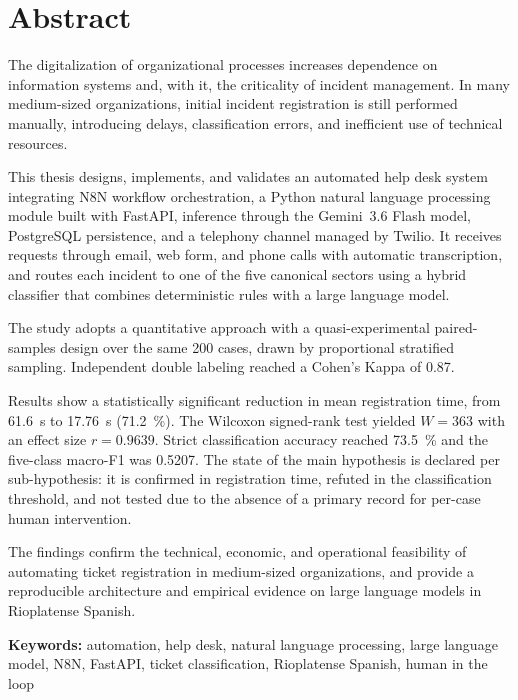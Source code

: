 \newpage
\section*{Abstract}

The digitalization of organizational processes increases dependence on information systems and, with it, the criticality of incident management. In many medium-sized organizations, initial incident registration is still performed manually, introducing delays, classification errors, and inefficient use of technical resources.

This thesis designs, implements, and validates an automated help desk system integrating N8N workflow orchestration, a Python natural language processing module built with FastAPI, inference through the Gemini~3.6 Flash model, PostgreSQL persistence, and a telephony channel managed by Twilio. It receives requests through email, web form, and phone calls with automatic transcription, and routes each incident to one of the five canonical sectors using a hybrid classifier that combines deterministic rules with a large language model.

The study adopts a quantitative approach with a quasi-experimental paired-samples design over the same 200 cases, drawn by proportional stratified sampling. Independent double labeling reached a Cohen's Kappa of 0.87.

Results show a statistically significant reduction in mean registration time, from 61.6~s to 17.76~s (71.2~\%). The Wilcoxon signed-rank test yielded \(W = 363\) with an effect size \(r = 0.9639\). Strict classification accuracy reached 73.5~\% and the five-class macro-F1 was 0.5207. The state of the main hypothesis is declared per sub-hypothesis: it is confirmed in registration time, refuted in the classification threshold, and not tested due to the absence of a primary record for per-case human intervention.

The findings confirm the technical, economic, and operational feasibility of automating ticket registration in medium-sized organizations, and provide a reproducible architecture and empirical evidence on large language models in Rioplatense Spanish.

\bigskip
\noindent\textbf{Keywords:} automation, help desk, natural language processing, large language model, N8N, FastAPI, ticket classification, Rioplatense Spanish, human in the loop

\newpage